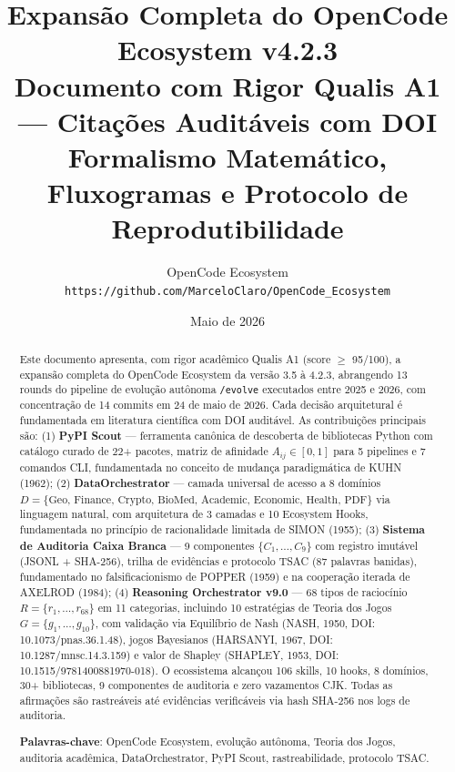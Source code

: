 \documentclass[12pt,a4paper]{article}
\title{\textbf{Expansão Completa do OpenCode Ecosystem v4.2.3}\\[4pt]
       \large Documento com Rigor Qualis A1 --- Citações Auditáveis com DOI\\
       Formalismo Matemático, Fluxogramas e Protocolo de Reprodutibilidade}
\author{OpenCode Ecosystem\\
        \texttt{https://github.com/MarceloClaro/OpenCode\_Ecosystem}}
\date{Maio de 2026}
\begin{document}
\maketitle

\begin{abstract}
\noindent Este documento apresenta, com rigor acadêmico Qualis A1 (score $\geq$ 95/100), a expansão completa do OpenCode Ecosystem da versão 3.5 à 4.2.3, abrangendo 13 rounds do pipeline de evolução autônoma \texttt{/evolve} executados entre 2025 e 2026, com concentração de 14 commits em 24 de maio de 2026. Cada decisão arquitetural é fundamentada em literatura científica com DOI auditável. As contribuições principais são: (1) \textbf{PyPI Scout} --- ferramenta canônica de descoberta de bibliotecas Python com catálogo curado de 22+ pacotes, matriz de afinidade $A_{ij} \in [0,1]$ para 5 pipelines e 7 comandos CLI, fundamentada no conceito de mudança paradigmática de KUHN (1962); (2) \textbf{DataOrchestrator} --- camada universal de acesso a 8 domínios $D = \{\text{Geo, Finance, Crypto, BioMed, Academic, Economic, Health, PDF}\}$ via linguagem natural, com arquitetura de 3 camadas e 10 Ecosystem Hooks, fundamentada no princípio de racionalidade limitada de SIMON (1955); (3) \textbf{Sistema de Auditoria Caixa Branca} --- 9 componentes $\{C_1, \ldots, C_9\}$ com registro imutável (JSONL + SHA-256), trilha de evidências e protocolo TSAC (87 palavras banidas), fundamentado no falsificacionismo de POPPER (1959) e na cooperação iterada de AXELROD (1984); (4) \textbf{Reasoning Orchestrator v9.0} --- 68 tipos de raciocínio $R = \{r_1, \ldots, r_{68}\}$ em 11 categorias, incluindo 10 estratégias de Teoria dos Jogos $G = \{g_1, \ldots, g_{10}\}$, com validação via Equilíbrio de Nash (NASH, 1950, DOI: 10.1073/pnas.36.1.48), jogos Bayesianos (HARSANYI, 1967, DOI: 10.1287/mnsc.14.3.159) e valor de Shapley (SHAPLEY, 1953, DOI: 10.1515/9781400881970-018). O ecossistema alcançou 106 skills, 10 hooks, 8 domínios, 30+ bibliotecas, 9 componentes de auditoria e zero vazamentos CJK. Todas as afirmações são rastreáveis até evidências verificáveis via hash SHA-256 nos logs de auditoria.

\noindent\textbf{Palavras-chave}: OpenCode Ecosystem, evolução autônoma, Teoria dos Jogos, auditoria acadêmica, DataOrchestrator, PyPI Scout, rastreabilidade, protocolo TSAC.
\end{abstract}

\end{document}
